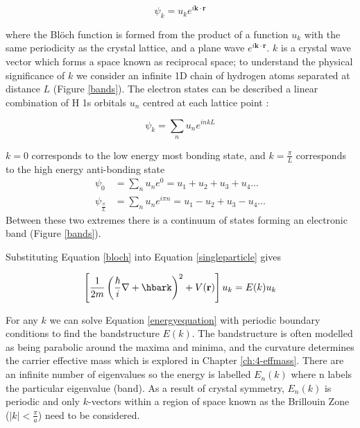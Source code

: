 \begin{equation} 
\psi_{k} = u_ke^{i\textbf{k}\cdot\textbf{r}}
\label{bloch}
\end{equation}   %

where the Bl\"{o}ch function is formed from the product of a function $u_k$ with the same periodicity as the crystal lattice, and a plane wave $e^{i\textbf{k}\cdot\textbf{r}}$. $k$ is a crystal wave vector which forms a space known as reciprocal space; to understand the physical significance of $k$ we consider an infinite 1D chain of hydrogen atoms separated at distance $L$ (Figure \ref{bands}). The electron states can be described a linear combination of H 1s orbitals $u_n$ centred at each lattice point :

\begin{equation}
\psi_k = \sum_nu_ne^{inkL}
\end{equation}

$k=0$ corresponds to the low energy most bonding state, and $k=\frac{\pi}{L}$ corresponds to the high energy anti-bonding state
\begin{align}
\psi_0 &= \sum_nu_ne^0 = u_1 +u_2 +u_3 +u_4 \dots \\
\psi_{\frac{\pi}{L}} &= \sum_nu_ne^{i\pi n} = u_1 -u_2+u_3-u_4 \dots
\end{align}
Between these two extremes there is a continuum of states forming an electronic band (Figure \ref{bands}). 

Substituting Equation \ref{bloch} into Equation \ref{singleparticle} gives

\begin{equation} \label{energyequation}
\left[\frac{1}{2m}\left(\frac{\hbar}{i}\nabla+\hbark\right)^2+V(\textbf{r})\right]u_k = E(k)u_k
\end{equation}

For any $k$ we can solve Equation \ref{energyequation} with periodic boundary conditions to find the bandstructure $E(k)$. The bandstructure is often modelled as being parabolic around the maxima and minima, and the curvature determines the carrier effective mass which is explored in Chapter \ref{ch:4-effmass}. There are an infinite number of eigenvalues so the energy is labelled $E_n(k)$ where n labels the particular eigenvalue (band). As a result of crystal symmetry, $E_n(k)$ is periodic and only $k$-vectors within a region of space known as the Brillouin Zone ($|k|<\frac{\pi}{a}$) need to be considered. %

